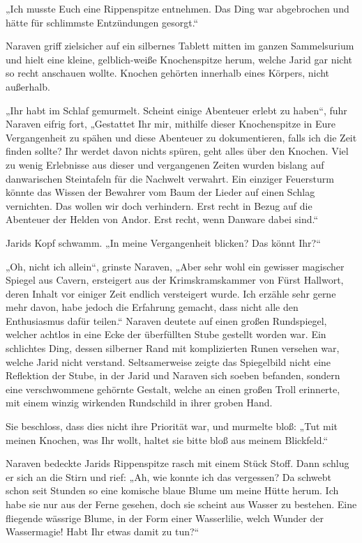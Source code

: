 „Ich musste Euch eine Rippenspitze entnehmen. Das Ding war abgebrochen und hätte für schlimmste Entzündungen gesorgt.“

Naraven griff zielsicher auf ein silbernes Tablett mitten im ganzen Sammelsurium und hielt eine kleine, gelblich-weiße Knochenspitze herum, welche Jarid gar nicht so recht anschauen wollte. Knochen gehörten innerhalb eines Körpers, nicht außerhalb.

„Ihr habt im Schlaf gemurmelt. Scheint einige Abenteuer erlebt zu haben“, fuhr Naraven eifrig fort, „Gestattet Ihr mir, mithilfe dieser Knochenspitze in Eure Vergangenheit zu spähen und diese Abenteuer zu dokumentieren, falls ich die Zeit finden sollte? Ihr werdet davon nichts spüren, geht alles über den Knochen. Viel zu wenig Erlebnisse aus dieser und vergangenen Zeiten wurden bislang auf danwarischen Steintafeln für die Nachwelt verwahrt. Ein einziger Feuersturm könnte das Wissen der Bewahrer vom Baum der Lieder auf einen Schlag vernichten. Das wollen wir doch verhindern. Erst recht in Bezug auf die Abenteuer der Helden von Andor. Erst recht, wenn Danware dabei sind.“

Jarids Kopf schwamm. „In meine Vergangenheit blicken? Das könnt Ihr?“

„Oh, nicht ich allein“, grinste Naraven, „Aber sehr wohl ein gewisser magischer Spiegel aus Cavern, ersteigert aus der Krimskramskammer von Fürst Hallwort, deren Inhalt vor einiger Zeit endlich versteigert wurde. Ich erzähle sehr gerne mehr davon, habe jedoch die Erfahrung gemacht, dass nicht alle den Enthusiasmus dafür teilen.“ Naraven deutete auf einen großen Rundspiegel, welcher achtlos in eine Ecke der überfüllten Stube gestellt worden war. Ein schlichtes Ding, dessen silberner Rand mit komplizierten Runen versehen war, welche Jarid nicht verstand. Seltsamerweise zeigte das Spiegelbild nicht eine Reflektion der Stube, in der Jarid und Naraven sich soeben befanden, sondern eine verschwommene gehörnte Gestalt, welche an einen großen Troll erinnerte, mit einem winzig wirkenden Rundschild in ihrer groben Hand.

Sie beschloss, dass dies nicht ihre Priorität war, und murmelte bloß: „Tut mit meinen Knochen, was Ihr wollt, haltet sie bitte bloß aus meinem Blickfeld.“

Naraven bedeckte Jarids Rippenspitze rasch mit einem Stück Stoff. Dann schlug er sich an die Stirn und rief: „Ah, wie konnte ich das vergessen? Da schwebt schon seit Stunden so eine komische blaue Blume um meine Hütte herum. Ich habe sie nur aus der Ferne gesehen, doch sie scheint aus Wasser zu bestehen. Eine fliegende wässrige Blume, in der Form einer Wasserlilie, welch Wunder der Wassermagie! Habt Ihr etwas damit zu tun?“

